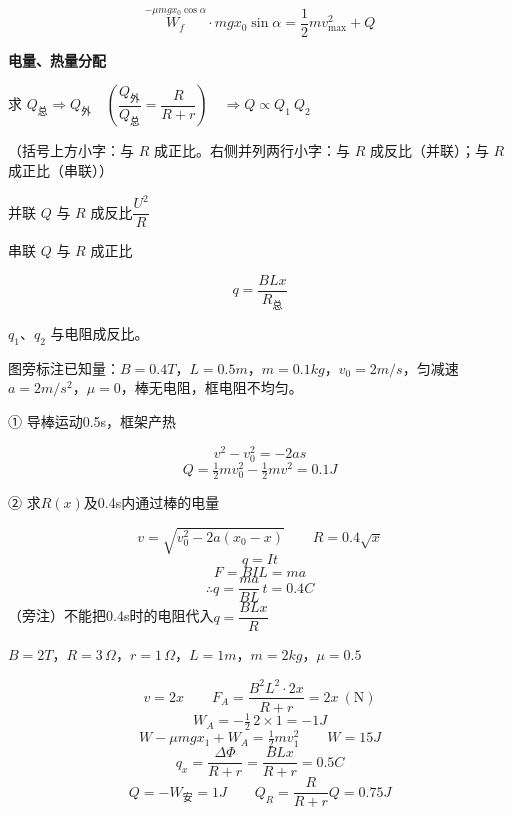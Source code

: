 \begin{problem}

\begin{solution}
\[
\overset{-\mu mgx_0\cos\alpha}{W_f}\cdot mgx_0\sin\alpha=\frac{1}{2}mv_{\max}^2+Q
\] %

\textbf{电量、热量分配}

求 $Q_{\text{总}}\Rightarrow Q_{\text{外}}$\ \ $\left(\dfrac{Q_{\text{外}}}{Q_{\text{总}}}=\dfrac{R}{R+r}\right)$\ \ $\Rightarrow Q\propto Q_1\ Q_2$ %

（括号上方小字：与 $R$ 成正比。右侧并列两行小字：与 $R$ 成反比（并联）；与 $R$ 成正比（串联））

并联 $Q$ 与 $R$ 成反比\quad $\dfrac{U^2}{R}$

串联 $Q$ 与 $R$ 成正比

\[
q=\frac{BLx}{R_{\text{总}}}
\]

$q_1$、$q_2$ 与电阻成反比。
\end{solution}
\end{problem}

\begin{problem}
图旁标注已知量：$B=0.4\unit{T}$，$L=0.5\unit{m}$，$m=0.1\unit{kg}$，$v_0=2\unit{m/s}$，匀减速 $a=2\unit{m/s^2}$，$\mu=0$，棒无电阻，框电阻不均匀。

① 导棒运动0.5s，框架产热 %
\begin{solution}
\[ v^2-v_0^2=-2as \]
\[ Q=\tfrac12mv_0^2-\tfrac12mv^2=0.1\unit{J} \]
\end{solution}
② 求$R(x)$及0.4s内通过棒的电量
\begin{solution}
\[ v=\sqrt{v_0^2-2a(x_0-x)}\qquad R=0.4\sqrt{x} \]
\[ q=It \]
\[ F=BIL=ma \]
\[ \therefore q=\frac{ma}{BL}\,t=0.4\unit{C} \]
（旁注）不能把0.4s时的电阻代入$q=\dfrac{BLx}{R}$
\end{solution}
\end{problem}

\begin{problem}
$B=2\unit{T}$，$R=3\,\Omega$，$r=1\,\Omega$，$L=1\unit{m}$，$m=2\unit{kg}$，$\mu=0.5$
\begin{solution}
\[ v=2x\qquad F_A=\frac{B^2L^2\cdot2x}{R+r}=2x\ (\mathrm{N}) \]
\[ W_A=-\tfrac12\,2\times1=-1\unit{J} \]
\[ W-\mu mgx_1+W_A=\tfrac12mv_1^2\qquad W=15\unit{J} \]
\[ q_x=\frac{\Delta\Phi}{R+r}=\frac{BLx}{R+r}=0.5\unit{C} \]
\[ Q=-W_{\text{安}}=1\unit{J}\qquad Q_R=\frac{R}{R+r}Q=0.75\unit{J} \]
\end{solution}
\end{problem}

